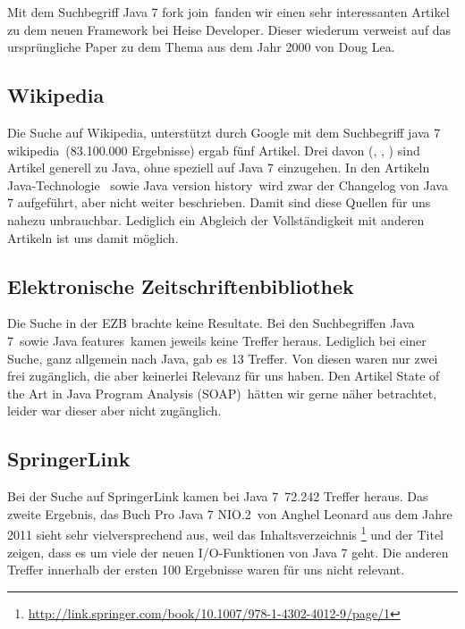 Mit dem Suchbegriff \glqq Java 7 fork join\grqq ~fanden wir einen sehr interessanten Artikel zu dem neuen Framework bei Heise Developer\cite{forkjoinheise}. Dieser wiederum verweist auf das ursprüngliche Paper zu dem Thema aus dem Jahr 2000 von Doug Lea\cite{forkjoinpaper}.

\subsection{Wikipedia}\label{wikichapter}
Die Suche auf Wikipedia, unterstützt durch Google mit dem Suchbegriff \glqq java 7 wikipedia\grqq ~(83.100.000 Ergebnisse) ergab
fünf Artikel. Drei davon (\cite{wikiJavaSoftwarePlatform}, \cite{wikiJavaProgrammiersprache}, \cite{wikiJavaStandardEdition})
sind Artikel generell zu Java, ohne speziell auf Java 7 einzugehen. In den Artikeln \glqq Java-Technologie\grqq\cite{wikiJavaTechnologie}
~sowie \glqq Java version history\grqq\cite{wikiJavaVersionHistory}~wird zwar der Changelog von Java 7 aufgeführt, aber nicht
weiter beschrieben. Damit sind diese Quellen für uns nahezu unbrauchbar. Lediglich ein Abgleich der Vollständigkeit mit anderen
Artikeln ist uns damit möglich.

\subsection{Elektronische Zeitschriftenbibliothek}
Die Suche in der EZB brachte keine Resultate. Bei den Suchbegriffen \glqq Java 7\grqq~sowie \glqq Java features\grqq~kamen
jeweils keine Treffer heraus. Lediglich bei einer Suche, ganz allgemein nach \glqq Java\grqq , gab es 13 Treffer. Von diesen waren
nur zwei frei zugänglich, die aber keinerlei Relevanz für uns haben. Den Artikel \glqq State of the Art in Java Program Analysis
(SOAP)\grqq ~hätten wir gerne näher betrachtet, leider war dieser aber nicht zugänglich.

\subsection{SpringerLink}
Bei der Suche auf SpringerLink kamen bei \glqq Java 7\grqq~72.242 Treffer heraus. Das zweite Ergebnis, das Buch \glqq Pro Java 7
NIO.2\grqq\cite{b247nio2}~von Anghel Leonard aus dem Jahre 2011 sieht sehr vielversprechend aus, weil das Inhaltsverzeichnis
\footnote{\url{http://link.springer.com/book/10.1007/978-1-4302-4012-9/page/1}} und der Titel zeigen, dass es um viele der neuen
I/O-Funktionen von Java 7 geht.
Die anderen Treffer innerhalb der ersten 100 Ergebnisse waren für uns nicht relevant.\\

